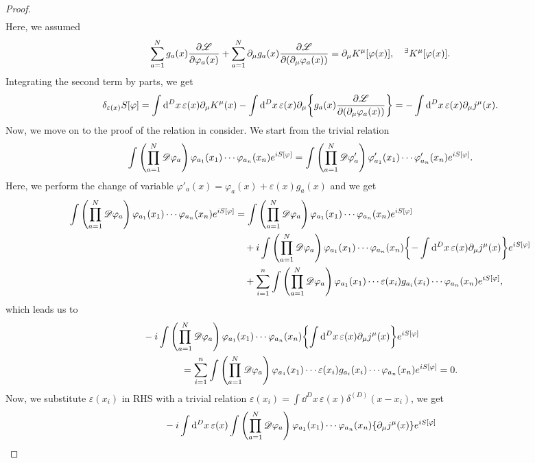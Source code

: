 \documentclass{article}
\theoremstyle{definition}
\numberwithin{equation}{section}
\newcommand{\fidim}{\int \qty(\prod_{a = 1}^{N} \mathscr{D}\varphi_a) \, }
\newcommand{\intst}{\int \dd^Dx \,}
\newcommand{\del}{\partial_\mu}
\newcommand{\lag}{\mathscr{L}}
\begin{document}
\begin{proof}
\begin{align}
  \end{align}
  Here, we assumed
  \begin{align}
    \sum_{a = 1}^{N}g_a(x) \pdv{\lag}{\varphi_a(x)} + \sum_{a = 1}^{N}\del g_a(x)\pdv{\lag}{(\del \varphi_a(x))} = \del K^\mu[\varphi(x)], \quad ^\exists K^\mu[\varphi(x)].
  \end{align}
  Integrating the second term by parts, we get 
  \begin{align}
    \delta_{\varepsilon(x)} S[\varphi] = \intst \varepsilon(x) \del K^\mu(x) - \intst \varepsilon(x) \del \qty{ g_a(x)\pdv{\lag}{(\del \varphi_a(x))}}
    = - \intst \varepsilon(x) \del j^\mu(x).
  \end{align}
  Now, we move on to the proof of the relation in consider. We start from the trivial relation
  \begin{align}
    \fidim \varphi_{a_1}(x_1) \cdots \varphi_{a_n}(x_n) e^{iS[\varphi]}
    = \int \qty(\prod_{a = 1}^{N} \mathscr{D}\varphi'_a)\, \varphi'_{a_1}(x_1) \cdots \varphi'_{a_n}(x_n) e^{iS[\varphi]}.
  \end{align}
  Here, we perform the change of variable $\varphi'_a(x) = \varphi_a(x) + \varepsilon(x) g_a(x)$ and we get
  \begin{align}
    \fidim \varphi_{a_1}(x_1) \cdots \varphi_{a_n}(x_n) e^{iS[\varphi]}
    &= \fidim \varphi_{a_1}(x_1) \cdots \varphi_{a_n}(x_n) e^{iS[\varphi]} \notag \\
    &\quad + i\fidim \varphi_{a_1}(x_1) \cdots \varphi_{a_n}(x_n) \qty{- \intst \varepsilon(x) \del j^\mu(x)}e^{iS[\varphi]} \notag \\
    &\quad + \sum_{i = 1}^{n} \fidim \varphi_{a_1}(x_1) \cdots \varepsilon(x_i) g_{a_i}(x_i) \cdots \varphi_{a_n}(x_n)e^{iS[\varphi]},
  \end{align}
  which leads us to
  \begin{align}
    &-i\fidim \varphi_{a_1}(x_1) \cdots \varphi_{a_n}(x_n) \qty{\intst \varepsilon(x) \del j^\mu(x)}e^{iS[\varphi]} \notag \\
    & \quad\quad\quad\quad = \sum_{i = 1}^{n} \fidim \varphi_{a_1}(x_1) \cdots \varepsilon(x_i) g_{a_i}(x_i) \cdots \varphi_{a_n}(x_n)e^{iS[\varphi]} = 0.
  \end{align}
  Now, we substitute $\varepsilon(x_i)$ in RHS with a trivial relation ${\displaystyle \varepsilon(x_i) = \intst \varepsilon(x) \delta^{(D)}(x - x_i)}$, we get
  \begin{align}
    &-i\intst \varepsilon(x) \fidim \varphi_{a_1}(x_1) \cdots \varphi_{a_n}(x_n) \qty{\del j^\mu(x)}e^{iS[\varphi]} \notag\\

\end{align}
\end{proof}
\end{document}
